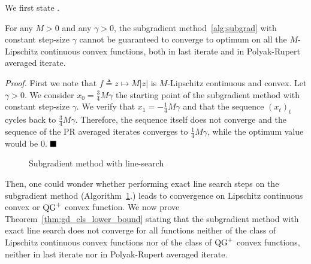     We first state .
    
    \begin{Th}
        For any $M>0$ and any $\gamma>0$, the subgradient method~\ref{alg:subgrad} with constant step-size $\gamma$ cannot be guaranteed to converge to optimum on all the $M$-Lipschitz continuous convex functions, both in last iterate and in Polyak-Rupert averaged iterate.
        \label{thm:subgrad_constant_lower_lip}
    \end{Th}

    \noindent \textit{Proof.}
        First we note that $f \triangleq z \mapsto M |z|$ is $M$-Lipschitz continuous and convex.
        Let $\gamma>0$.
        We consider $x_0 = \frac{3}{4}M\gamma$ the starting point of the subgradient method with constant step-size $\gamma$.
        We verify that $x_1 = -\frac{1}{4}M\gamma$ and that the sequence $(x_t)_t$ cycles back to $\frac{3}{4}M\gamma$.
        Therefore, the sequence itself does not converge and the sequence of the PR averaged iterates converges to $\frac{1}{4}M\gamma$, while the optimum value would be 0.
    $\hfill\blacksquare$

    \begin{figure}
        \begin{minipage}{0.56\textwidth}
            \vspace{-1.0cm}
            \begin{algorithm}[H]
                \caption{Subgradient method with line-search \label{alg:subgrad_els}}
            \end{algorithm}
        \end{minipage}
    \end{figure}

    Then, one could wonder whether performing exact line search steps on the subgradient method (Algorithm~\ref{alg:subgrad_els}.) leads to convergence on Lipschitz continuous convex or $\operatorname{QG}^+$ convex function.
    We now prove Theorem~\ref{thm:gd_els_lower_bound} stating that the subgradient method with exact line search does not converge for all functions neither of the class of Lipschitz continuous convex functions nor of the class of $\operatorname{QG}^+$ convex functions, neither in last iterate nor in Polyak-Rupert averaged iterate.
    
